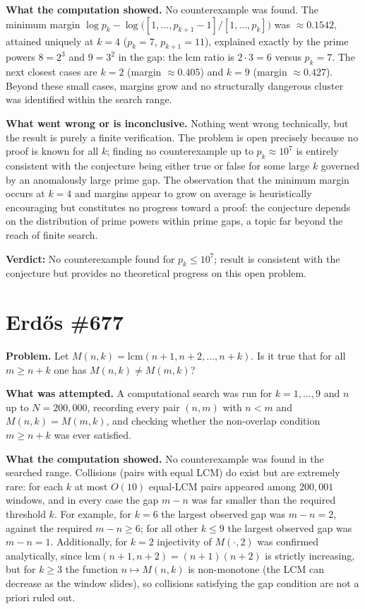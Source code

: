 \documentclass[11pt]{article}
\begin{document}
\textbf{What the computation showed.} No counterexample was found. The minimum margin $\log p_k - \log\!\bigl([1,\ldots,p_{k+1}-1]/[1,\ldots,p_k]\bigr)$ was $\approx 0.1542$, attained uniquely at $k=4$ ($p_k=7$, $p_{k+1}=11$), explained exactly by the prime powers $8=2^3$ and $9=3^2$ in the gap: the lcm ratio is $2\cdot 3=6$ versus $p_k=7$. The next closest cases are $k=2$ (margin $\approx 0.405$) and $k=9$ (margin $\approx 0.427$). Beyond these small cases, margins grow and no structurally dangerous cluster was identified within the search range.

\textbf{What went wrong or is inconclusive.} Nothing went wrong technically, but the result is purely a finite verification. The problem is open precisely because no proof is known for all $k$; finding no counterexample up to $p_k \approx 10^7$ is entirely consistent with the conjecture being either true or false for some large $k$ governed by an anomalously large prime gap. The observation that the minimum margin occurs at $k=4$ and margins appear to grow on average is heuristically encouraging but constitutes no progress toward a proof: the conjecture depends on the distribution of prime powers within prime gaps, a topic far beyond the reach of finite search.

\textbf{Verdict:} No counterexample found for $p_k \leq 10^7$; result is consistent with the conjecture but provides no theoretical progress on this open problem.

\clearpage

\section{Erd\H{o}s \#677}

\textbf{Problem.} Let $M(n,k) = \mathrm{lcm}(n+1, n+2, \ldots, n+k)$. Is it true that for all $m \geq n+k$ one has $M(n,k) \neq M(m,k)$?

\textbf{What was attempted.} A computational search was run for $k = 1, \ldots, 9$ and $n$ up to $N = 200{,}000$, recording every pair $(n, m)$ with $n < m$ and $M(n,k) = M(m,k)$, and checking whether the non-overlap condition $m \geq n + k$ was ever satisfied.

\textbf{What the computation showed.} No counterexample was found in the searched range. Collisions (pairs with equal LCM) do exist but are extremely rare: for each $k$ at most $O(10)$ equal-LCM pairs appeared among $200{,}001$ windows, and in every case the gap $m - n$ was far smaller than the required threshold $k$. For example, for $k = 6$ the largest observed gap was $m - n = 2$, against the required $m - n \geq 6$; for all other $k \leq 9$ the largest observed gap was $m - n = 1$. Additionally, for $k = 2$ injectivity of $M(\cdot, 2)$ was confirmed analytically, since $\mathrm{lcm}(n+1, n+2) = (n+1)(n+2)$ is strictly increasing, but for $k \geq 3$ the function $n \mapsto M(n,k)$ is non-monotone (the LCM can decrease as the window slides), so collisions satisfying the gap condition are not a priori ruled out.
\end{document}
